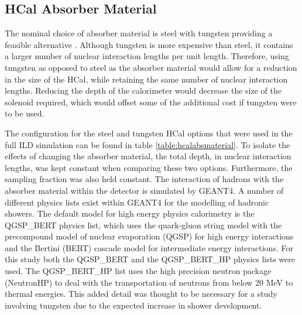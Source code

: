 
\subsection{HCal Absorber Material}
\label{sec:hcalabsorbermaterial}
The nominal choice of absorber material is steel with tungsten providing a feasible alternative \cite{Blaising:2015nla}.  Although tungsten is more expensive than steel, it contains a larger number of nuclear interaction lengths per unit length.  Therefore, using tungsten as opposed to steel as the absorber material would allow for a reduction in the size of the HCal, while retaining the same number of nuclear interaction lengths.  Reducing the depth of the calorimeter would decrease the size of the solenoid required, which would offset some of the additional cost if tungsten were to be used. 

The configuration for the steel and tungsten HCal options that were used in the full ILD simulation can be found in table \ref{table:hcalabsmaterial}.  To isolate the effects of changing the absorber material, the total depth, in nuclear interaction lengths, was kept constant when comparing these two options.  Furthermore, the sampling fraction was also held constant.  The interaction of hadrons with the absorber material within the detector is simulated by GEANT4.  A number of different physics lists exist within GEANT4 for the modelling of hadronic showers.  The default model for high energy physics calorimetry is the QGSP\_BERT physics list, which uses the quark-gluon string model \cite{Folger:2003sb} with the precompound model of nuclear evaporation \cite{geantStringModel} (QGSP) for high energy interactions and the Bertini (BERT) cascade model \cite{Guthrie:1968ue} for intermediate energy interactions.  For this study both the QGSP\_BERT and the QGSP\_BERT\_HP physics lists were used.  The QGSP\_BERT\_HP list uses the high precision neutron package (NeutronHP) to deal with the transportation of neutrons from below 20 MeV to thermal energies.  This added detail was thought to be necessary for a study involving tungsten due to the expected increase in shower development.    

